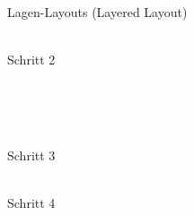 \begin{TOP}{Lagen-Layouts (Layered Layout)}
{\begin{minipage}{0.24\textwidth}
	\end{minipage}
	\begin{minipage}{0.48\textwidth}
		\\
		\centering Schritt 2
	\end{minipage}\\
	\vspace*{\baselineskip}\\
	\phantom{1}\hfill\begin{minipage}{0.24\textwidth}
		\\
		\centering Schritt 3
	\end{minipage}
	\hspace*{0.5cm}
	\begin{minipage}{0.24\textwidth}
		\\
		\centering Schritt 4
	\end{minipage}\hfill\phantom{1}
}
\topbreak
{}
\topbreak
{}
\end{TOP}